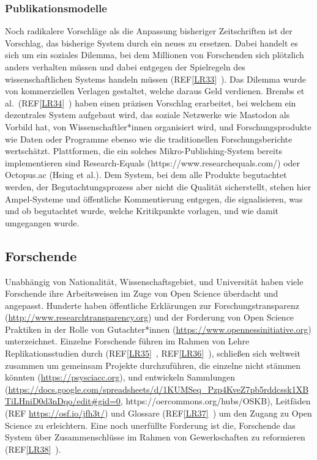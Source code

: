 \documentclass[
  letterpaper,
  DIV=11,
  numbers=noendperiod]{scrreprt}
\begin{document}
\subsubsection{Publikationsmodelle}\label{publikationsmodelle}

Noch radikalere Vorschläge als die Anpassung bisheriger Zeitschriften
ist der Vorschlag, das bisherige System durch ein neues zu ersetzen.
Dabei handelt es sich um ein soziales Dilemma, bei dem Millionen von
Forschenden sich plötzlich anders verhalten müssen und dabei entgegen
der Spielregeln des wissenschaftlichen Systems handeln müssen
(REF\hyperref[_msocom_33]{{[}LR33{]}}~). Das Dilemma wurde von
kommerziellen Verlagen gestaltet, welche daraus Geld verdienen. Brembs
et al.~(REF\hyperref[_msocom_34]{{[}LR34{]}}~) haben einen präzisen
Vorschlag erarbeitet, bei welchem ein dezentrales System aufgebaut wird,
das soziale Netzwerke wie Mastodon als Vorbild hat, von
Wissenschaftler*innen organisiert wird, und Forschungsprodukte wie Daten
oder Programme ebenso wie die traditionellen Forschungsberichte
wertschätzt. Plattformen, die ein solches Mikro-Publishing-System
bereits implementieren sind Research-Equals
(https://www.researchequals.com/) oder Octopus.ac (Hsing et al.). Dem
System, bei dem alle Produkte begutachtet werden, der
Begutachtungsprozess aber nicht die Qualität sicherstellt, stehen hier
Ampel-Systeme und öffentliche Kommentierung entgegen, die signalisieren,
was und ob begutachtet wurde, welche Kritikpunkte vorlagen, und wie
damit umgegangen wurde.

\subsection{Forschende}\label{forschende}

Unabhängig von Nationalität, Wissenschaftsgebiet, und Universität haben
viele Forschende ihre Arbeitsweisen im Zuge von Open Science überdacht
und angepasst. Hunderte haben öffentliche Erklärungen zur
Forschungstransparenz (\url{http://www.researchtransparency.org}) und
der Forderung von Open Science Praktiken in der Rolle von
Gutachter*innen (\url{https://www.opennessinitiative.org})
unterzeichnet. Einzelne Forschende führen im Rahmen von Lehre
Replikationsstudien durch (REF\hyperref[_msocom_35]{{[}LR35{]}}~,
REF\hyperref[_msocom_36]{{[}LR36{]}}~), schließen sich weltweit zusammen
um gemeinsam Projekte durchzuführen, die einzelne nicht stämmen könnten
(\url{https://psysciacc.org}), und entwickeln Sammlungen
(\url{https://docs.google.com/spreadsheets/d/1KUMSeq_Pzp4KveZ7pb5rddcssk1XBTiLHniD0d3nDqo/edit\#gid=0},
https://oercommons.org/hubs/OSKB), Leitfäden (REF
\url{https://osf.io/jfh3t/}) und Glossare
(REF\hyperref[_msocom_37]{{[}LR37{]}}~) um den Zugang zu Open Science zu
erleichtern. Eine noch unerfüllte Forderung ist die, Forschende das
System über Zusammenschlüsse im Rahmen von Gewerkschaften zu reformieren
(REF\hyperref[_msocom_38]{{[}LR38{]}}~).
\end{document}
